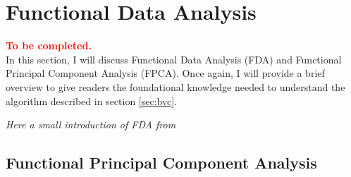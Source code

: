 \section{Functional Data Analysis}
\label{sec:fda}
\textbf{\textcolor{red}{To be completed.}}
\\
In this section, I will discuss Functional Data Analysis (FDA) and Functional Principal Component Analysis (FPCA). Once again, I will provide a brief overview to give readers the foundational knowledge needed to understand the algorithm described in section \ref{sec:bvc}. 

\textit{Here a small introduction of FDA from \cite{ramsay_functional_2009}}
\subsection{Functional Principal Component Analysis}


